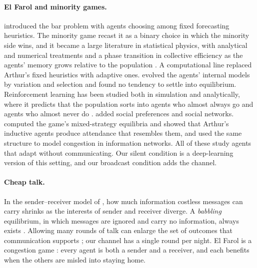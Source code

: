 \documentclass[11pt]{article}
\begin{document}
\paragraph{El Farol and minority games.}
\citet{arthur1994} introduced the bar problem with agents choosing among fixed forecasting heuristics. The minority game \citep{challet1997} recast it as a binary choice in which the minority side wins, and it became a large literature in statistical physics, with analytical and numerical treatments \citep{challet1998} and a phase transition in collective efficiency as the agents' memory grows relative to the population \citep{savit1999}. A computational line replaced Arthur's fixed heuristics with adaptive ones. \citet{fogel1999} evolved the agents' internal models by variation and selection and found no tendency to settle into equilibrium. Reinforcement learning has been studied both in simulation \citep{franke2003} and analytically, where it predicts that the population sorts into agents who almost always go and agents who almost never do \citep{whitehead2008}. \citet{chen2017} added social preferences and social networks. \citet{zambrano2004} computed the game's mixed-strategy equilibria and showed that Arthur's inductive agents produce attendance that resembles them, and \citet{bell2003} used the same structure to model congestion in information networks. All of these study agents that adapt without communicating. Our silent condition is a deep-learning version of this setting, and our broadcast condition adds the channel.

\paragraph{Cheap talk.}
In the sender--receiver model of \citet{crawford1982}, how much information costless messages can carry shrinks as the interests of sender and receiver diverge. A \emph{babbling} equilibrium, in which messages are ignored and carry no information, always exists \citep{farrell1996}. Allowing many rounds of talk can enlarge the set of outcomes that communication supports \citep{aumann2003}; our channel has a single round per night. El Farol is a congestion game \citep{rosenthal1973}: every agent is both a sender and a receiver, and each benefits when the others are misled into staying home.
\end{document}
